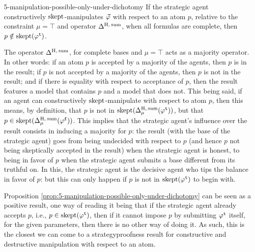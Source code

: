 \begin{prp}{}{5-manipulation-possible-only-under-dichotomy}
	If the strategic agent constructively 
	$\skept$-manipulates $\P$ with respect to an atom $p$, 
	relative to the constraint $\mu=\top$ 
	and operator $\me^{\hamming,\:\ssum}$, 
	when all formulas are complete,
	then $p\notin\skept(\truth{\phi})$.
\end{prp}
\begin{prf*}{}{}%
	The operator $\me^{\hamming,\:\ssum}$, 
	for complete bases and $\mu=\top$ acts as a majority operator.
	In other words:
	if an atom $p$ is accepted by a majority of the agents, then $p$ is in the result;
	if $p$ is not accepted by a majority of the agents, then $p$ is not in the result;
	and if there is equality with respect to acceptance of $p$, 
	then the result features a model that contains $p$
	and a model that does not.
	This being said, if an agent can constructively 
	$\skept$-manipulate with respect to atom $p$, 
	then this means, by definition,
	that $p$ is not in $\skept(\me^{\hamming,\:\ssum}_\mu(\truth{\phi}))$, 
	but that $p\in\skept(\me^{\hamming,\:\ssum}_\mu(\manip{\phi}))$. 
	This implies that the strategic agent's
	influence over the result consists in inducing a majority for $p$: 
	the result (with the base of the strategic agent) goes
	from being undecided with respect to $p$ 
	(and hence $p$ not being skeptically accepted in the result) 
	when the strategic agent
	is honest, to being in favor of $p$ when the strategic agent 
	submits a base different from its truthful on.
	In this, the strategic agent is the decisive agent who tips 
	the balance in favor of $p$: but this can only happen if $p$ is not 
	in $\skept(\truth{\phi})$ to begin with.
\end{prf*}


Proposition \ref{prop:5-manipulation-possible-only-under-dichotomy} 
can be seen as a positive result,
one way of reading it being that if the strategic agent 
already accepts $p$, i.e., $p\in\skept(\truth{\phi})$, then if it cannot impose $p$ by 
submitting $\truth{\phi}$ itself, for the given parameters, 
then there is no other way of doing it. As such, this is the closest we can come to a 
strategyproofness result for constructive and destructive manipulation with respect to an atom.




